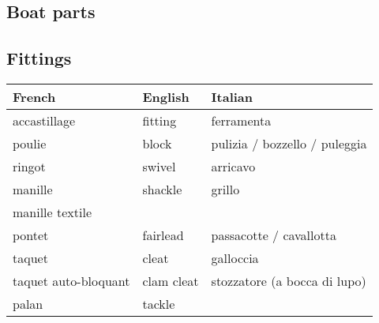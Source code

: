 \documentclass[a4paper, 12pt, twoside]{article}
\begin{document}
\begin{indt}{\section{Boat parts}}
        \begin{indt}{\subsection{Fittings}} %
            \begin{tabular}{|l|l|l|}
                \hline %
                \textbf{French}
                & \textbf{English}
                & \textbf{Italian}
                \\
                \hline
                \hline %
                accastillage %
                & fitting
                & ferramenta
                \\
                \hline %
                poulie %
                & block
                & pulizia / bozzello / puleggia
                \\
                \hline %
                ringot %
                & swivel
                & arricavo
                \\
                \hline %
                manille %
                & shackle
                & grillo
                \\
                \hline %
                manille textile %
                &
                &
                \\
                \hline %
                pontet %
                & fairlead
                & passacotte / cavallotta
                \\
                \hline %
                taquet %
                & cleat
                & galloccia
                \\
                \hline %
                taquet auto-bloquant %
                & clam cleat
                & stozzatore (a bocca di lupo)
                \\
                \hline %
                palan %
                & tackle
                &
                \\
                \hline %
            \end{tabular}
        \end{indt} %


\end{indt}
\end{document}
